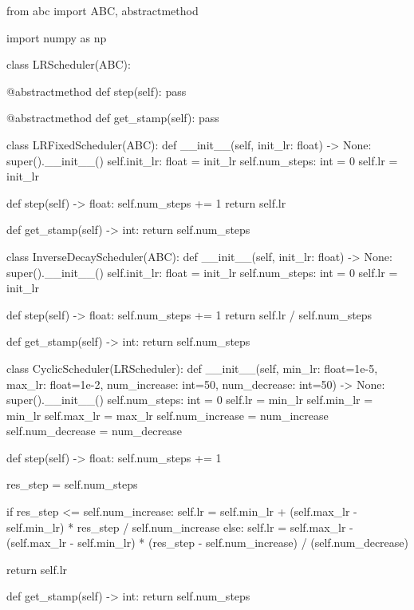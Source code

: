 \documentclass[14pt, a4paper]{article}
\theoremstyle{sltheorem}
\theoremstyle{soltheorem}
\begin{document}
\begin{python}
from abc import ABC, abstractmethod

import numpy as np
    
class LRScheduler(ABC):
    
    @abstractmethod
    def step(self):
        pass
    
    @abstractmethod
    def get_stamp(self):
        pass
    
    
class LRFixedScheduler(ABC):
    def __init__(self, init_lr: float) -> None:
        super().__init__()
        self.init_lr: float = init_lr
        self.num_steps: int = 0
        self.lr = init_lr
        
        
    def step(self) -> float:
        self.num_steps += 1
        return self.lr
    
    
    def get_stamp(self) -> int:
        return self.num_steps
    
    
class InverseDecayScheduler(ABC):
    def __init__(self, init_lr: float) -> None:
        super().__init__()
        self.init_lr: float = init_lr
        self.num_steps: int = 0
        self.lr = init_lr
        
        
    def step(self) -> float:
        self.num_steps += 1
        return self.lr / self.num_steps
    
    
    def get_stamp(self) -> int:
        return self.num_steps
    
    
class CyclicScheduler(LRScheduler):
    def __init__(self, min_lr: float=1e-5, max_lr: float=1e-2, num_increase: int=50, num_decrease: int=50) -> None:
        super().__init__()
        self.num_steps: int = 0
        self.lr = min_lr
        self.min_lr = min_lr
        self.max_lr = max_lr
        self.num_increase  = num_increase
        self.num_decrease = num_decrease
        
    def step(self) -> float:
        self.num_steps += 1
    
        res_step = self.num_steps %

        if res_step <= self.num_increase:
            self.lr =  self.min_lr + (self.max_lr - self.min_lr) * res_step / self.num_increase
        else:
            self.lr = self.max_lr - (self.max_lr - self.min_lr) * (res_step - self.num_increase) / (self.num_decrease)
            
        return self.lr
    
    def get_stamp(self) -> int:
        return self.num_steps
    

\end{python}
\end{document}

